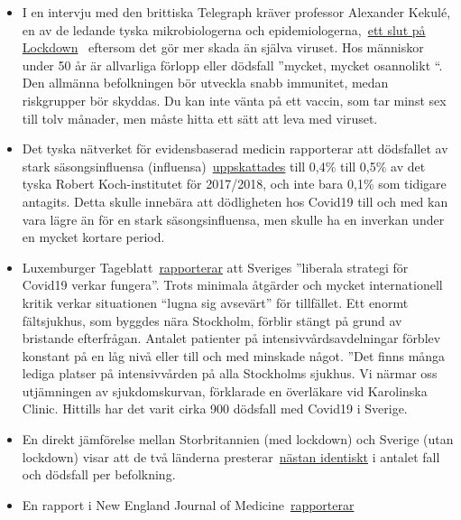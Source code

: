 \begin{itemize}
\tightlist
\item
  I en intervju med den brittiska Telegraph kräver professor Alexander
  Kekulé, en av de ledande tyska mikrobiologerna och
  epidemiologerna,~\href{https://www.telegraph.co.uk/news/2020/04/11/german-scientist-predicted-european-epidemic-calls-end-lockdown/}{ett
  slut på Lockdown}~ eftersom det gör mer skada än själva viruset. Hos
  människor under 50 år är allvarliga förlopp eller dödsfall ''mycket,
  mycket osannolikt ``. Den allmänna befolkningen bör utveckla snabb
  immunitet, medan riskgrupper bör skyddas. Du kan inte vänta på ett
  vaccin, som tar minst sex till tolv månader, men måste hitta ett sätt
  att leva med viruset.
\item
  Det tyska nätverket för evidensbaserad medicin rapporterar att
  dödsfallet av stark säsongsinfluensa
  (influensa)~\href{https://www.ebm-netzwerk.de/en/publications/covid-19}{uppskattades}
  till 0,4\% till 0,5\% av det tyska Robert Koch-institutet för
  2017/2018, och inte bara 0,1\% som tidigare antagits. Detta skulle
  innebära att dödligheten hos Covid19 till och med kan vara lägre än
  för en stark säsongsinfluensa, men skulle ha en inverkan under en
  mycket kortare period.
\item
  Luxemburger
  Tageblatt~\href{https://swprs.files.wordpress.com/2020/04/volksblatt_schweden_corona_20200414_18.pdf}{rapporterar}
  att Sveriges ''liberala strategi för Covid19 verkar fungera''. Trots
  minimala åtgärder och mycket internationell kritik verkar situationen
  ``lugna sig avsevärt'' för tillfället. Ett enormt fältsjukhus, som
  byggdes nära Stockholm, förblir stängt på grund av bristande
  efterfrågan. Antalet patienter på intensivvårdsavdelningar förblev
  konstant på en låg nivå eller till och med minskade något. ''Det finns
  många lediga platser på intensivvården på alla Stockholms sjukhus. Vi
  närmar oss utjämningen av sjukdomskurvan, förklarade en överläkare vid
  Karolinska Clinic. Hittills har det varit cirka 900 dödsfall med
  Covid19 i Sverige.
\item
  En direkt jämförelse mellan Storbritannien (med lockdown) och Sverige
  (utan lockdown) visar att de två länderna
  presterar~\href{http://www.theblogmire.com/a-comparison-of-lockdown-uk-with-non-lockdown-sweden/}{nästan
  identiskt} i antalet fall och dödsfall per befolkning.
\item
  En rapport i New England Journal of
  Medicine~\href{https://www.ynet.co.il/articles/0,7340,L-5714371,00.html}{rapporterar}

\end{itemize}

